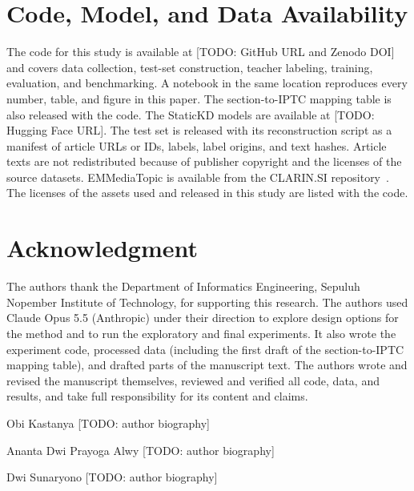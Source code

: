 \documentclass{ieeeaccess}
\DeclareRobustCommand{\todo}[1]{{\color{red}[TODO: #1]}}
\begin{document}
\section*{Code, Model, and Data Availability}
The code for this study is available at \todo{GitHub URL and Zenodo DOI} and covers data collection, test-set construction, teacher labeling, training, evaluation, and benchmarking. A notebook in the same location reproduces every number, table, and figure in this paper. The section-to-IPTC mapping table is also released with the code. The StaticKD models are available at \todo{Hugging Face URL}. The test set is released with its reconstruction script as a manifest of article URLs or IDs, labels, label origins, and text hashes. Article texts are not redistributed because of publisher copyright and the licenses of the source datasets. EMMediaTopic is available from the CLARIN.SI repository~\cite{emmediatopic2025}. The licenses of the assets used and released in this study are listed with the code.

\section*{Acknowledgment}
The authors thank the Department of Informatics Engineering, Sepuluh Nopember Institute of Technology, for supporting this research. The authors used Claude Opus 5.5 (Anthropic) under their direction to explore design options for the method and to run the exploratory and final experiments. It also wrote the experiment code, processed data (including the first draft of the section-to-IPTC mapping table), and drafted parts of the manuscript text. The authors wrote and revised the manuscript themselves, reviewed and verified all code, data, and results, and take full responsibility for its content and claims.




\begin{IEEEbiographynophoto}{Obi Kastanya}
\todo{author biography}
\end{IEEEbiographynophoto}

\begin{IEEEbiographynophoto}{Ananta Dwi Prayoga Alwy}
\todo{author biography}
\end{IEEEbiographynophoto}

\begin{IEEEbiographynophoto}{Dwi Sunaryono}
\todo{author biography}
\end{IEEEbiographynophoto}

\EOD
\end{document}
